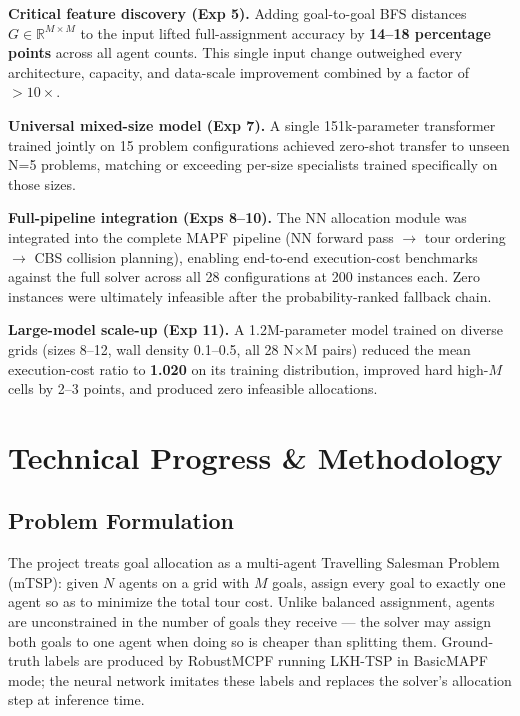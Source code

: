 \documentclass[11pt,a4paper]{article}
\begin{document}
\textbf{Critical feature discovery (Exp 5).} Adding goal-to-goal BFS distances
$G\in\mathbb{R}^{M\times M}$ to the input lifted full-assignment accuracy by \textbf{14--18
percentage points} across all agent counts. This single input change outweighed every
architecture, capacity, and data-scale improvement combined by a factor of $>10\times$.

\textbf{Universal mixed-size model (Exp 7).} A single 151k-parameter transformer trained jointly
on 15 problem configurations achieved zero-shot transfer to unseen N=5 problems, matching or
exceeding per-size specialists trained specifically on those sizes.

\textbf{Full-pipeline integration (Exps 8--10).} The NN allocation module was integrated into
the complete MAPF pipeline (NN forward pass $\to$ tour ordering $\to$ CBS collision planning),
enabling end-to-end execution-cost benchmarks against the full solver across all 28 configurations
at 200 instances each. Zero instances were ultimately infeasible after the probability-ranked
fallback chain.

\textbf{Large-model scale-up (Exp 11).} A 1.2M-parameter model trained on diverse grids (sizes
8--12, wall density 0.1--0.5, all 28 N$\times$M pairs) reduced the mean execution-cost ratio
to \textbf{1.020} on its training distribution, improved hard high-$M$ cells by 2--3 points,
and produced zero infeasible allocations.

\section{Technical Progress \& Methodology}

\subsection{Problem Formulation}

The project treats goal allocation as a multi-agent Travelling Salesman Problem (mTSP): given
$N$ agents on a grid with $M$ goals, assign every goal to exactly one agent so as to minimize
the total tour cost. Unlike balanced assignment, agents are unconstrained in the number of goals
they receive --- the solver may assign both goals to one agent when doing so is cheaper than
splitting them. Ground-truth labels are produced by RobustMCPF running LKH-TSP in BasicMAPF
mode; the neural network imitates these labels and replaces the solver's allocation step at
inference time.
\end{document}
